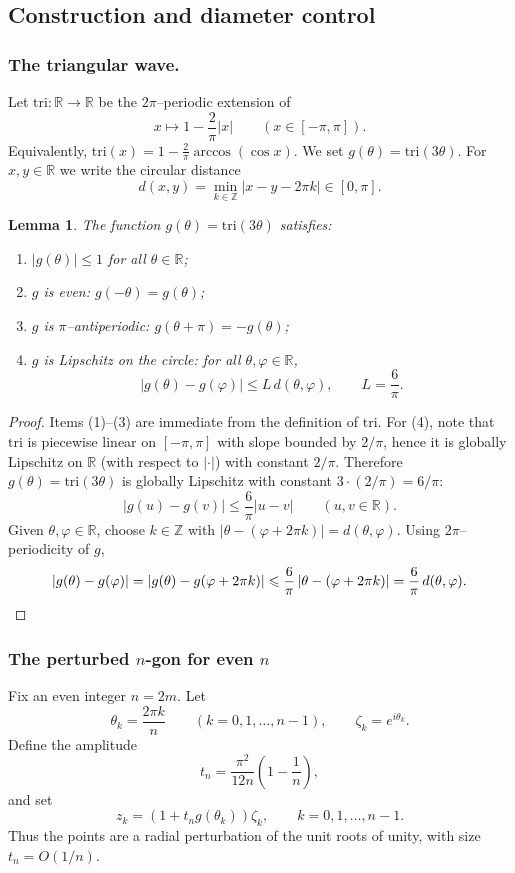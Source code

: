 \documentclass{article}
\newtheorem{lem}[thr]{Lemma}
\theoremstyle{definition}
\let\le\leqslant
\renewcommand*{\phi}{\varphi}
\begin{document}
\subsection{Construction and diameter control}
\subsubsection{The triangular wave.}
Let $\mathrm{tri}:\mathbb R\to\mathbb R$ be the $2\pi$--periodic extension of
\[
x\mapsto 1-\frac{2}{\pi}|x|\qquad (x\in[-\pi,\pi]).
\]
Equivalently, $\mathrm{tri}(x)=1-\frac{2}{\pi}\arccos(\cos x)$.
We set \(g(\theta)=\mathrm{tri}(3\theta)\). For $x,y\in\mathbb R$ we write the circular distance
\[
d(x,y)=\min_{k\in\mathbb Z}|x-y-2\pi k|\in[0,\pi].
\]

\begin{lem}\label{lem:gprops}
The function $g(\theta)=\mathrm{tri}(3\theta)$ satisfies:
\begin{enumerate}
\item[(1)] $|g(\theta)|\le 1$ for all $\theta\in\mathbb R$;
\item[(2)] $g$ is even: $g(-\theta)=g(\theta)$;
\item[(3)] $g$ is $\pi$--antiperiodic: $g(\theta+\pi)=-g(\theta)$;
\item[(4)] $g$ is Lipschitz on the circle: for all $\theta,\phi\in\mathbb R$,
\[
|g(\theta)-g(\phi)|\le L\, d(\theta,\phi),
\qquad L=\frac{6}{\pi}.
\]
\end{enumerate}
\end{lem}

\begin{proof}
Items (1)--(3) are immediate from the definition of $\mathrm{tri}$.
For (4), note that $\mathrm{tri}$ is piecewise linear on $[-\pi,\pi]$ with slope bounded by $2/\pi$,
hence it is globally Lipschitz on $\mathbb R$ (with respect to $|\cdot|$) with constant $2/\pi$.
Therefore $g(\theta)=\mathrm{tri}(3\theta)$ is globally Lipschitz with constant $3\cdot(2/\pi)=6/\pi$:
\[
|g(u)-g(v)|\le \frac{6}{\pi}|u-v|\qquad (u,v\in\mathbb R).
\]
Given $\theta,\phi\in\mathbb R$, choose $k\in\mathbb Z$ with
$|\theta-(\phi+2\pi k)|=d(\theta,\phi)$. Using $2\pi$--periodicity of $g$,
\[
|g(\theta)-g(\phi)|
=
|g(\theta)-g(\phi+2\pi k)|
\le \frac{6}{\pi}\,|\theta-(\phi+2\pi k)|
= \frac{6}{\pi}\,d(\theta,\phi).
\qedhere
\]
\end{proof}

\subsubsection{The perturbed $n$-gon for even $n$}
Fix an even integer $n=2m$. Let
\[
\theta_k=\frac{2\pi k}{n}\qquad (k=0,1,\dots,n-1),\qquad \zeta_k=e^{i\theta_k}.
\]
Define the amplitude
\[
t_n=\frac{\pi^2}{12n}\left(1-\frac{1}{n}\right),
\]
and set
\[
z_k=\left(1+t_n g(\theta_k)\right) \zeta_k,\qquad k=0,1,\dots,n-1.
\]
Thus the points are a radial perturbation of the unit roots of unity, with size $t_n=O(1/n)$.
\end{document}
